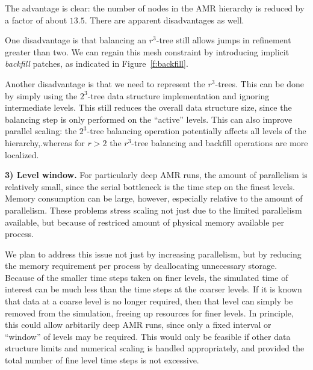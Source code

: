 \documentclass[10pt]{article}
\begin{document}
The advantage is clear: the number of nodes in the AMR hierarchy is
reduced by a factor of about $13.5$.  There are apparent disadvantages
as well.

One disadvantage is that balancing an $r^3$-tree still allows jumps in
refinement greater than two.  We can regain this mesh constraint by
introducing implicit \textit{backfill} patches, as indicated in
Figure~\ref{f:backfill}.


Another disadvantage is that we need to represent the $r^3$-trees.
This can be done by simply using the $2^3$-tree data structure
implementation and ignoring intermediate levels.  This still reduces
the overall data structure size, since the balancing step is only
performed on the ``active'' levels.  This can also improve parallel
scaling: the $2^3$-tree balancing operation potentially affects all
levels of the hierarchy,.whereas for $r>2$ the $r^3$-tree balancing
and backfill operations are more localized.


\textbf{3) Level window.}  For particularly deep AMR runs, the
amount of parallelism is relatively small, since the serial bottleneck
is the time step on the finest levels.  Memory consumption can be
large, however, especially relative to the amount of parallelism.
These problems stress scaling not just due to the limited parallelism
available, but because of restriced amount of physical memory
available per process.

We plan to address this issue not just by increasing parallelism, but
by reducing the memory requirement per process by deallocating
unnecessary storage.  Because of the smaller time steps taken on finer
levels, the simulated time of interest can be much less than the time
steps at the coarser levels.  If it is known that data at a coarse
level is no longer required, then that level can simply be removed
from the simulation, freeing up resources for finer levels.  In
principle, this could allow arbitarily deep AMR runs, since only a
fixed interval or ``window'' of levels may be required.  This would
only be feasible if other data structure limits and numerical scaling
is handled appropriately, and provided the total number of fine level
time steps is not excessive.
\end{document}
